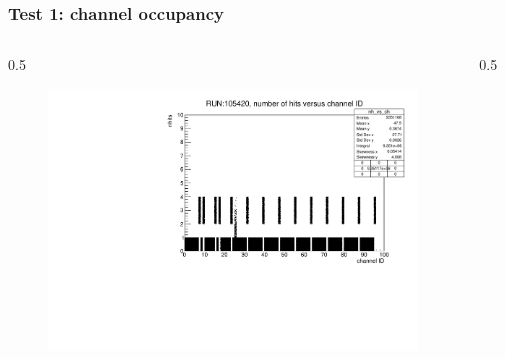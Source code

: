 \documentclass{beamer}
\begin{document}
\begin{frame}
\frametitle{Test 1: channel occupancy}
\vspace{-4mm}
\begin{columns}
\begin{column}{0.5\framewidth}
         \begin{figure}[!h]
      \centering
      \hspace*{-2em}
      \includegraphics[width=1.1\columnwidth]{figures/pdf/run105420_nh_vs_ch.pdf}
     \label{fig:normalhits}
\end{figure}
\end{column}
\begin{column}{0.5\framewidth}
      \begin{figure}[!h]
      \centering
            \hspace*{-1em}

\end{figure}
\end{column}
\end{columns}
\end{frame}
\end{document}
